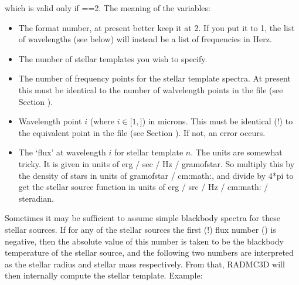 \documentclass[letterpaper,10pt,english]{sphinxmanual}
\begin{document}
which is valid only if ==2. The meaning of the variables:
\begin{itemize}
\item {} 
 The format number, at present better keep it at 2.
If you put it to 1, the list of wavelengths (see below) will instead be
a list of frequencies in Herz.

\item {} 
 The number of stellar templates you wish to specify.

\item {} 
 The number of frequency points for the stellar
template spectra. At present this must be identical to the number of
walvelength points in the file  (see
Section {\hyperref[\detokenize{inputoutputfiles:sec-wavelengths}]{}}).

\item {} 
 Wavelength point \(i\) (where \(i\in
[1,\)\(]\)) in microns. This must be identical (!) to the
equivalent point in the file  (see
Section {\hyperref[\detokenize{inputoutputfiles:sec-wavelengths}]{}}). If not, an error occurs.

\item {} 
 The ‘flux’ at wavelength \(i\) for
stellar template \(n\). The units are somewhat tricky. It is given in units
of erg / sec / Hz / gram\sphinxhyphen{}of\sphinxhyphen{}star. So multiply this by the density of
stars in units of gram\sphinxhyphen{}of\sphinxhyphen{}star / cm:math:, and divide by 4*pi to get the
stellar source function in units of erg / src / Hz / cm:math: / steradian.

\end{itemize}

Sometimes it may be sufficient to assume simple blackbody spectra
for these stellar sources. If for any of the stellar sources the first (!)
flux number () is negative, then the absolute
value of this number is taken to be the blackbody temperature of the stellar
source, and the following two numbers are interpreted as the stellar radius
and stellar mass respectively. From that, RADMC\sphinxhyphen{}3D will then internally
compute the stellar template. Example:
\end{document}

